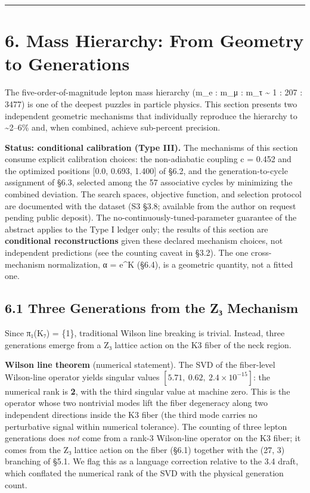 \documentclass[11pt,a4paper]{article}
\begin{document}
\begin{center}\rule{\linewidth}{0.5pt}\end{center}

\section{6. Mass Hierarchy: From Geometry to Generations}\label{mass-hierarchy-from-geometry-to-generations}

The five-order-of-magnitude lepton mass hierarchy (m\_\allowbreak{}e : m\_\allowbreak{}μ : m\_\allowbreak{}τ \textasciitilde{} 1 : 207 : 3477) is one of the deepest puzzles in particle physics. This section presents two independent geometric mechanisms that individually reproduce the hierarchy to \textasciitilde2--6\% and, when combined, achieve sub-percent precision.

\textbf{Status: conditional calibration (Type III).} The mechanisms of this section consume explicit calibration choices: the non-adiabatic coupling c = 0.452 and the optimized positions {[}0.0, 0.693, 1.400{]} of §6.2, and the generation-to-cycle assignment of §6.3, selected among the 57 associative cycles by minimizing the combined deviation. The search spaces, objective function, and selection protocol are documented with the dataset (S3 §3.8; available from the author on request pending public deposit). The no-continuously-tuned-parameter guarantee of the abstract applies to the Type I ledger only; the results of this section are \textbf{conditional reconstructions} given these declared mechanism choices, not independent predictions (see the counting caveat in §3.2). The one cross-mechanism normalization, α = e\^{}K (§6.4), is a geometric quantity, not a fitted one.

\subsection{6.1 Three Generations from the Z₃ Mechanism}\label{three-generations-from-the-zux2083-mechanism}

Since π₁(K₇) = \{1\}, traditional Wilson line breaking is trivial. Instead, three generations emerge from a Z₃ lattice action on the K3 fiber of the neck region.

\textbf{Wilson line theorem} (numerical statement). The SVD of the fiber-level Wilson-line operator yields singular values \([5.71,\ 0.62,\ 2.4 \times 10^{-15}]\): the numerical rank is \textbf{2}, with the third singular value at machine zero. This is the operator whose two nontrivial modes lift the fiber degeneracy along two independent directions inside the K3 fiber (the third mode carries no perturbative signal within numerical tolerance). The counting of three lepton generations does \emph{not} come from a rank-3 Wilson-line operator on the K3 fiber; it comes from the Z₃ lattice action on the fiber (§6.1) together with the (27, 3) branching of §5.1. We flag this as a language correction relative to the 3.4 draft, which conflated the numerical rank of the SVD with the physical generation count.
\end{document}
